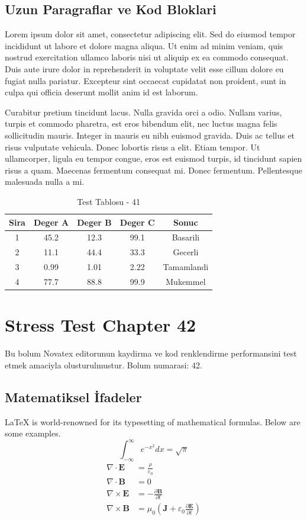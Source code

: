 \documentclass[12pt,a4paper]{article}
\begin{document}
\subsection{Uzun Paragraflar ve Kod Bloklari}
Lorem ipsum dolor sit amet, consectetur adipiscing elit. Sed do eiusmod tempor incididunt ut labore et dolore magna aliqua. Ut enim ad minim veniam, quis nostrud exercitation ullamco laboris nisi ut aliquip ex ea commodo consequat. Duis aute irure dolor in reprehenderit in voluptate velit esse cillum dolore eu fugiat nulla pariatur. Excepteur sint occaecat cupidatat non proident, sunt in culpa qui officia deserunt mollit anim id est laborum.

Curabitur pretium tincidunt lacus. Nulla gravida orci a odio. Nullam varius, turpis et commodo pharetra, est eros bibendum elit, nec luctus magna felis sollicitudin mauris. Integer in mauris eu nibh euismod gravida. Duis ac tellus et risus vulputate vehicula. Donec lobortis risus a elit. Etiam tempor. Ut ullamcorper, ligula eu tempor congue, eros est euismod turpis, id tincidunt sapien risus a quam. Maecenas fermentum consequat mi. Donec fermentum. Pellentesque malesuada nulla a mi.

\begin{table}[h!]
\centering
\begin{tabular}{|c|c|c|c|c|}
\hline
\textbf{Sira} & \textbf{Deger A} & \textbf{Deger B} & \textbf{Deger C} & \textbf{Sonuc} \\
\hline
1 & 45.2 & 12.3 & 99.1 & Basarili \\
2 & 11.1 & 44.4 & 33.3 & Gecerli \\
3 & 0.99 & 1.01 & 2.22 & Tamamlandi \\
4 & 77.7 & 88.8 & 99.9 & Mukemmel \\
\hline
\end{tabular}
\caption{Test Tablosu - 41}
\end{table}

\newpage
\section{Stress Test Chapter 42}
Bu bolum Novatex editorunun kaydirma ve kod renklendirme performansini test etmek amaciyla olusturulmustur. Bolum numarasi: 42.

\subsection{Matematiksel İfadeler}
\LaTeX{} is world-renowned for its typesetting of mathematical formulas. Below are some examples.
\begin{equation}
\int_{-\infty}^{\infty} e^{-x^2} dx = \sqrt{\pi}
\end{equation}
\begin{align}
\nabla \cdot \mathbf{E} &= \frac{\rho}{\varepsilon_0} \\
\nabla \cdot \mathbf{B} &= 0 \\
\nabla \times \mathbf{E} &= -\frac{\partial \mathbf{B}}{\partial t} \\
\nabla \times \mathbf{B} &= \mu_0\left(\mathbf{J} + \varepsilon_0 \frac{\partial \mathbf{E}}{\partial t}\right)
\end{align}
\end{document}
